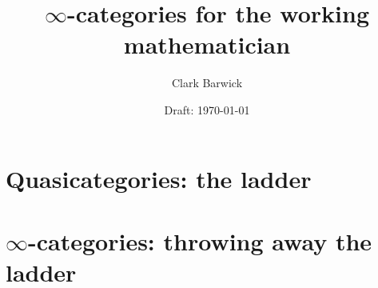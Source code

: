 \documentclass{cambridge7A}
\begin{document}
\author{Clark Barwick}
\title{$\infty$-categories for the working mathematician}
\date{Draft: \today}
\subtitle{}
\maketitle

\frontmatter

%
%
%
%

\setcounter{tocdepth}{2}
\tableofcontents

%

\mainmatter



\part{Quasicategories: the ladder}

\noindent 



\part{$\infty$-categories: throwing away the ladder}

\noindent 

\appendix

\backmatter




%
%

\end{document}
